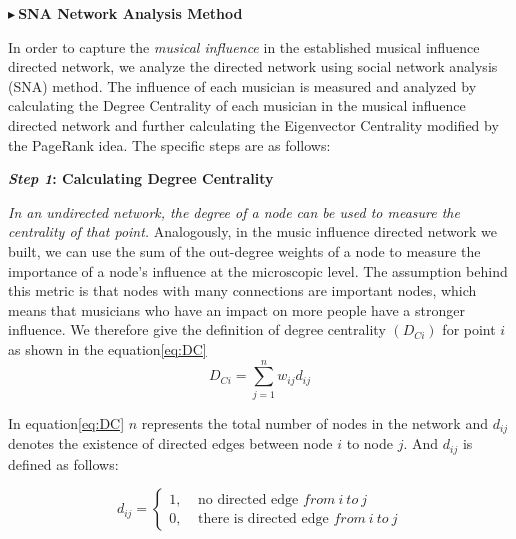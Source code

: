 \documentclass[12pt]{article}  %
\newenvironment{shrinkeq}[1]
{ \bgroup
	\addtolength\abovedisplayshortskip{#1}
	\addtolength\abovedisplayskip{#1}
	\addtolength\belowdisplayshortskip{#1}
	\addtolength\belowdisplayskip{#1}}
{\egroup\ignorespacesafterend}
\begin{document}
\noindent$\blacktriangleright\ $\textbf{\large{SNA Network Analysis Method}}

In order to capture the \emph{musical influence} in the established musical influence directed network, we analyze the directed network using social network analysis (SNA) method\cite{1}. The influence of each musician is measured and analyzed by calculating the Degree Centrality of each musician in the musical influence directed network and further calculating the Eigenvector Centrality modified by the PageRank idea. The specific steps are as follows:

\textbf{\emph{Step 1}: Calculating Degree Centrality}

\emph{In an undirected network, the degree of a node can be used to measure the centrality of that point.} Analogously, in the music influence directed network we built, we can use the sum of the out-degree weights of a node to measure the importance of a node's influence at the microscopic level. The assumption behind this metric is that nodes with many connections are important nodes, which means that musicians who have an impact on more people have a stronger influence. We therefore give the definition of degree centrality $(D_{Ci})$ for point $i$ as shown in the equation\eqref{eq:DC}
\begin{shrinkeq}{-1.5ex}
	\begin{equation}\label{eq:DC}
	D_{Ci}=\sum\limits_{j=1}^{n}w_{ij}d_{ij}
	\end{equation}
\end{shrinkeq}


In equation\eqref{eq:DC} $n$ represents the total number of nodes in the network and $d_{ij}$ denotes the existence of directed edges between node $i$ to node $j$. And $d_{ij}$ is defined as follows:

\begin{shrinkeq}{-1.5ex}
	\begin{equation}
	d_{ij}=\begin{cases}
	1,\ \ \ \ \ \text{no directed edge  }from\  i\ to\ j\\
	0,\ \ \ \ \ \text{there is directed edge  } from\  i\ to\ j
	\end{cases}
	\end{equation}
\end{shrinkeq}
\end{document}

